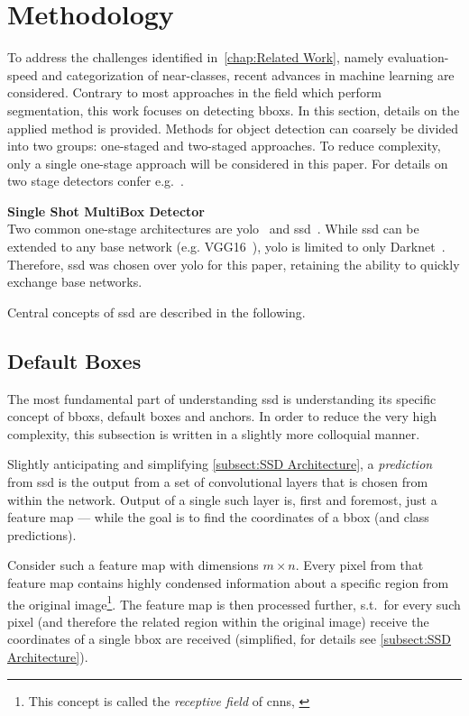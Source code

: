 \section{Methodology}\label{sect:methodology}
To address the challenges identified in~\cref{chap:Related Work}, namely
evaluation-speed and categorization of near-classes, recent advances in machine
learning are considered. Contrary to most approaches in the field which perform
segmentation, this work focuses on detecting \glspl{bbox}. In this section,
details on the applied method is provided. Methods for object detection can coarsely
be divided into two groups: one-staged and two-staged approaches. To reduce complexity,
only a single one-stage approach will be considered in this paper. For details on
two stage detectors confer e.g.\ \cite{Ren.2015}.

\bigskip
{\large{\textbf{Single Shot MultiBox Detector}}}\\
Two common one-stage architectures are
\gls{yolo}~\cite{Redmon.2015, Redmon.2016b, Redmon.2018} and
\gls{ssd}~\cite{Liu.2016}. While \gls{ssd} can be extended to any base network
(e.g. VGG16~\cite{Simonyan.2015}), \gls{yolo} is limited to only Darknet~\cite{Redmon.2016}.
Therefore, \gls{ssd} was chosen over \gls{yolo} for this paper, retaining the
ability to quickly exchange base networks.

Central concepts of \gls{ssd} are described in the following.

\subsection{Default Boxes}\label{subsect:default-boxes}
The most fundamental part of understanding \gls{ssd} is understanding its specific
concept of \glspl{bbox}, default boxes and anchors. In order to reduce the very high
complexity, this subsection is written in a slightly more colloquial manner.

Slightly anticipating and simplifying \cref{subsect:SSD Architecture}, a
\emph{prediction} from \gls{ssd} is the output from a set of \glspl{convolutional layer}
that is chosen from within the network. Output of a single such \gls{layer} is,
first and foremost, just a \gls{feature map} --- while the goal is to find the
coordinates of a \gls{bbox} (and class predictions). 

Consider such a \gls{feature map} with dimensions \(m \times n\). Every pixel
from that \gls{feature map} contains highly condensed information about a specific
region from the original image\footnote{This concept is called the
\emph{receptive field} of \glspl{cnn}, \cite[cf.][331\psq]{Goodfellow.2016}}.
The \gls{feature map} is then processed further, s.t.\ for every such
pixel (and therefore the related region within the original image) receive the
coordinates of a single \gls{bbox} are received (simplified, for details see \cref{subsect:SSD Architecture}).

